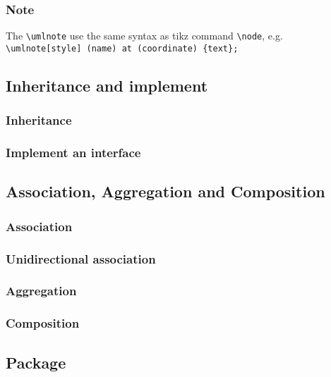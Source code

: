 \documentclass{article}
\newcommand{\demo}[2][1]{
\begin{minipage}{.49\linewidth}
\centering
\resizebox{#1\linewidth}{!}{

}
\end{minipage}
\hspace{0.01\linewidth}
\begin{minipage}{.5\linewidth}

\end{minipage}
}
\begin{document}
\subsubsection{Note}
The \lstinline|\umlnote| use the same syntax as tikz command
\lstinline|\node|, e.g. \lstinline|\umlnote[style] (name) at (coordinate) {text};|

\demo[0.7]{note}

\subsection{Inheritance and implement}
\subsubsection{Inheritance}
\demo{inheritance}
 
\subsubsection{Implement an interface}
\demo{implement-interface}

\subsection{Association, Aggregation and Composition}
\subsubsection{Association} 
\demo{association}
 
\subsubsection{Unidirectional association}
\demo{unidirectional-association}

\subsubsection{Aggregation}
\demo{aggregation}

\subsubsection{Composition}
\demo{composition}

\subsection{Package}
\demo{package}
\end{document}
